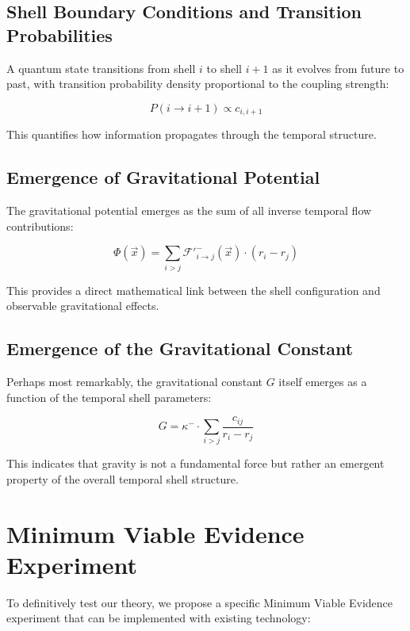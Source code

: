 \documentclass[12pt,a4paper]{article}
\begin{document}
\subsection{Shell Boundary Conditions and Transition Probabilities}

A quantum state transitions from shell $i$ to shell $i+1$ as it evolves from future to past, with transition probability density proportional to the coupling strength:

\begin{equation}
P(i \rightarrow i+1) \propto c_{i,i+1}
\end{equation}

This quantifies how information propagates through the temporal structure.

\subsection{Emergence of Gravitational Potential}

The gravitational potential emerges as the sum of all inverse temporal flow contributions:

\begin{equation}
\Phi(\vec{x}) = \sum_{i>j} \mathcal{F}'^{-}_{i \to j}(\vec{x}) \cdot (r_i - r_j)
\end{equation}

This provides a direct mathematical link between the shell configuration and observable gravitational effects.

\subsection{Emergence of the Gravitational Constant}

Perhaps most remarkably, the gravitational constant $G$ itself emerges as a function of the temporal shell parameters:

\begin{equation}
G = \kappa^- \cdot \sum_{i>j} \frac{c_{ij}}{r_i - r_j}
\end{equation}

This indicates that gravity is not a fundamental force but rather an emergent property of the overall temporal shell structure.

\section{Minimum Viable Evidence Experiment}

To definitively test our theory, we propose a specific Minimum Viable Evidence experiment that can be implemented with existing technology:
\end{document}
